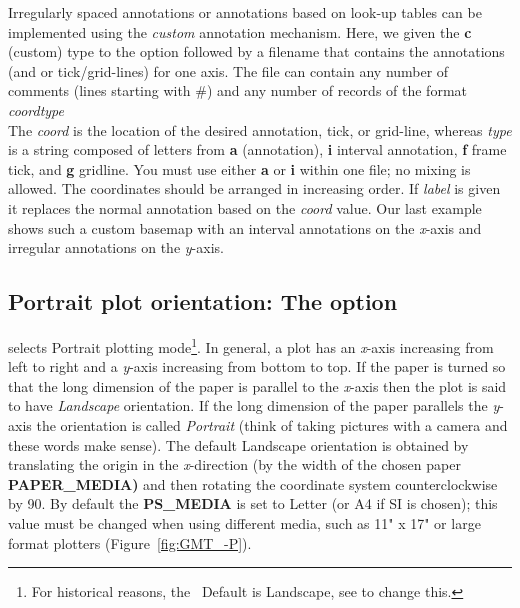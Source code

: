 Irregularly spaced annotations or annotations based on look-up tables can be implemented using
the \emph{custom} annotation mechanism.  Here, we given the \textbf{c} (custom) type to the 
option followed by a filename that contains the annotations (and or tick/grid-lines) for one axis.
The file can contain any number of comments (lines starting with \#) and any number of records of
the format
\\
\emph{coord}\quad	\emph{type}
\\
The \emph{coord} is the location of the desired annotation, tick, or grid-line, whereas
\emph{type} is a string composed of letters from \textbf{a} (annotation), \textbf{i} interval
annotation, \textbf{f} frame tick, and \textbf{g} gridline.  You must use either \textbf{a} or \textbf{i}
within one file; no mixing is allowed.  The coordinates should be arranged in increasing order.
If \emph{label} is given it replaces the normal
annotation based on the \emph{coord} value.  Our last example shows such a custom basemap
with an interval annotations on the \emph{x}-axis and irregular annotations on the \emph{y}-axis.



\subsection{Portrait plot orientation: The  option} 


 selects Portrait plotting mode\footnote{For historical reasons, the \GMT\
Default is Landscape, see  to change this.}.  In general,
a plot has an \emph{x}-axis increasing from left to
right and a \emph{y}-axis increasing from bottom to top.  If the
paper is turned so that the long dimension of the paper is
parallel to the \emph{x}-axis then the plot is said to have
\emph{Landscape} orientation.  If the long dimension of
the paper parallels the \emph{y}-axis the orientation is called
\emph{Portrait} (think of taking pictures with a camera
and these words make sense).  The
default Landscape orientation is obtained by translating the origin in the
\emph{x}-direction (by the width of the chosen paper \textbf{PAPER\_MEDIA)} and then rotating the
coordinate system counterclockwise by 90\DS.  By default the \textbf{PS\_MEDIA} is
set to Letter (or A4 if SI is chosen); this value must be changed
when using different media, such as 11" x 17" or large format plotters
(Figure~\ref{fig:GMT_-P}).


